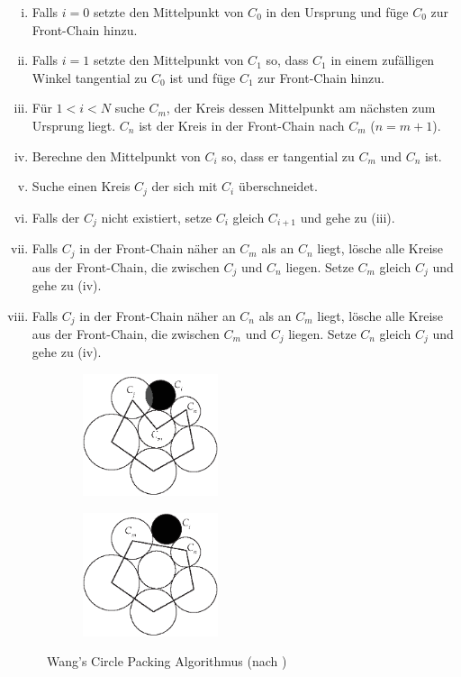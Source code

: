 \begin{enumerate}[(i), labelindent=0pt, align=left, itemsep=0pt, parsep=0pt, labelsep=.5em, leftmargin=!]
  \item Falls $i = 0$ setzte den Mittelpunkt von $C_0$ in den Ursprung und füge $C_0$ zur Front-Chain hinzu.
  \item Falls $i = 1$ setzte den Mittelpunkt von $C_1$ so, dass $C_1$ in einem zufälligen Winkel tangential zu $C_0$ ist und füge $C_1$ zur Front-Chain hinzu.
  \item Für $1 < i < N$ suche $C_m$, der Kreis dessen Mittelpunkt am nächsten zum Ursprung liegt. $C_n$ ist der Kreis in der Front-Chain nach $C_m$ ($n=m+1$).
  \item Berechne den Mittelpunkt von $C_i$ so, dass er tangential zu $C_m$ und $C_n$ ist.
  \item Suche einen Kreis $C_j$ der sich mit $C_i$ überschneidet.
  \item Falls der $C_j$ nicht existiert, setze $C_i$ gleich $C_{i+1}$ und gehe zu (iii).
  \item Falls $C_j$ in der Front-Chain näher an $C_m$ als an $C_n$ liegt, lösche alle Kreise aus der Front-Chain, die zwischen $C_j$ und $C_n$ liegen. Setze $C_m$ gleich $C_j$ und gehe zu (iv).
  \item Falls $C_j$ in der Front-Chain näher an $C_n$ als an $C_m$ liegt, lösche alle Kreise aus der Front-Chain, die zwischen $C_m$ und $C_j$ liegen. Setze $C_n$ gleich $C_j$ und gehe zu (iv).
\end{enumerate}

\label{subsec:collision}\setlength{\fwidth}{.4\textwidth}
\begin{figure}[htb]
  \captionsetup{justification=centering}
  \begin{subfigure}[t]{\fwidth}
   \includegraphics[width=150px]{figures/add-circle}
    \label{fig:add-circle}
  \end{subfigure}
  \hspace{1cm}
  \begin{subfigure}[t]{\fwidth}
  	\includegraphics[width=150px]{figures/update-frontchain}
  	 \label{fig:update-frontchain}
  \end{subfigure}
  \caption{Wang's Circle Packing Algorithmus (nach \cite{bostock2017abetter})}
  \label{fig:Circle-packing}
\end{figure}

